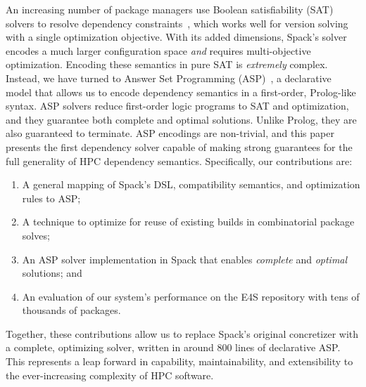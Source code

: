 An increasing number of package managers use Boolean satisfiability (SAT) solvers to
resolve dependency constraints~\cite{abate2020dependency}, which works well for version
solving with a single optimization objective. With its added dimensions, Spack's solver
encodes a much larger configuration space {\it and} requires multi-objective
optimization. Encoding these semantics in pure SAT is {\it extremely} complex. Instead,
we have turned to Answer Set Programming
(ASP)~\cite{gebser+:asp-book,marek+:asp-origins}, a declarative model that allows us to
encode dependency semantics in a first-order, Prolog-like syntax. ASP solvers reduce
first-order logic programs to SAT and optimization, and they guarantee both complete
and optimal solutions. Unlike Prolog, they are also guaranteed to terminate. ASP
encodings are non-trivial, and this paper presents the first dependency solver capable
of making strong guarantees for the full generality of HPC dependency semantics.
Specifically, our contributions are:

\begin{enumerate}
\item A general mapping of Spack's DSL, compatibility semantics, and optimization rules
  to ASP;
\item A technique to optimize for reuse of existing builds in combinatorial package
  solves;
\item An ASP solver implementation in Spack that enables {\it complete} and {\it
  optimal} solutions; and
\item An evaluation of our system's performance on the E4S repository with tens of
  thousands of packages.
\end{enumerate}

Together, these contributions allow us to replace Spack's original concretizer with a
complete, optimizing solver, written in around 800 lines of declarative ASP. This
represents a leap forward in capability, maintainability, and extensibility to the
ever-increasing complexity of HPC software.

